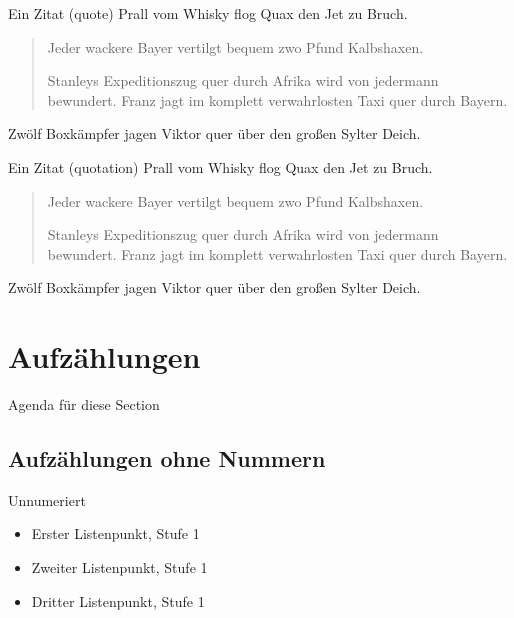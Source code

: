 \documentclass[t, aspectratio=169, ngerman]{beamer}
\begin{document}
	\begin{frame}{Ein Zitat (quote)}
		Prall vom Whisky flog Quax den Jet zu Bruch.

		\begin{quote}
			Jeder wackere Bayer vertilgt bequem zwo Pfund Kalbshaxen.

			Stanleys Expeditionszug quer durch Afrika wird von jedermann bewundert.
			Franz jagt im komplett verwahrlosten Taxi quer durch Bayern.
		\end{quote}

		Zwölf Boxkämpfer jagen Viktor quer über den großen Sylter Deich.
	\end{frame}

	\begin{frame}{Ein Zitat (quotation)}
		Prall vom Whisky flog Quax den Jet zu Bruch.

		\begin{quotation}
			Jeder wackere Bayer vertilgt bequem zwo Pfund Kalbshaxen.

			Stanleys Expeditionszug quer durch Afrika wird von jedermann bewundert.
			Franz jagt im komplett verwahrlosten Taxi quer durch Bayern.
		\end{quotation}

		Zwölf Boxkämpfer jagen Viktor quer über den großen Sylter Deich.
	\end{frame}

	\section{Aufzählungen}

	\begin{frame}{Agenda für diese Section}
		\tableofcontents[currentsection]
	\end{frame}

	\subsection{Aufzählungen ohne Nummern}

	\begin{frame}{Unnumeriert}
		\begin{itemize}
			\item Erster Listenpunkt, Stufe 1
			\item Zweiter Listenpunkt, Stufe 1
			\item Dritter Listenpunkt, Stufe 1
		\end{itemize}
	\end{frame}
\end{document}
